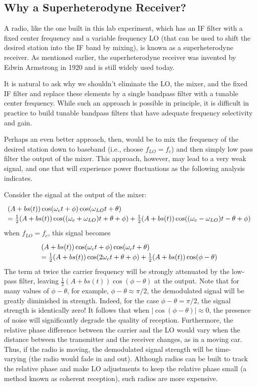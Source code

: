 \documentclass[a4paper]{article}
\begin{document}
\subsection{Why a Superheterodyne Receiver?}
A radio, like the one built in this lab experiment, which has an IF filter with a fixed center frequency and a variable frequency LO (that can be used to shift the desired station into the IF band by mixing), is known as a superheterodyne receiver. As mentioned earlier, the superheterodyne receiver was invented by Edwin Armstrong in 1920 and is still widely used today.

It is natural to ask why we shouldn’t eliminate the LO, the mixer, and the fixed IF filter and replace these elements by a single bandpass filter with a tunable center frequency. While such an approach is possible in principle, it is difficult in practice to build tunable bandpass filters that have adequate frequency selectivity and gain.

Perhaps an even better approach, then, would be to mix the frequency of the desired station down to baseband (i.e., choose $f_{LO}=f_c$) and then simply low pass filter the output of the mixer. This approach, however, may lead to a very weak signal, and one that will experience power fluctuations as the following analysis indicates.

Consider the signal at the output of the mixer:
\[\arraycolsep=1.4pt\def\arraystretch{1.2}
\begin{array}{ll}
	&(A+bs(t))\cos(\omega_ct+\phi)\cos(\omega_{LO}t+\theta)\\
	&=\frac{1}{2}(A+bs(t))\cos((\omega_c+\omega_{LO})t+\theta+\phi)+\frac{1}{2}(A+bs(t))\cos((\omega_c-\omega_{LO})t-\theta+\phi)
\end{array}\]
when $f_{LO}=f_c$, this signal becomes
\[\arraycolsep=1.4pt\def\arraystretch{1.2}
\begin{array}{ll}
	&(A+bs(t))\cos(\omega_ct+\phi)\cos(\omega_ct+\theta)\\
	&=\frac{1}{2}(A+bs(t))\cos(2\omega_ct+\theta+\phi)+\frac{1}{2}(A+bs(t))\cos(\phi-\theta)
\end{array}\]
The term at twice the carrier frequency will be strongly attenuated by the low-pass filter, leaving $\frac{1}{2}(A + bs(t))\cos(\phi-\theta)$ at the output. Note that for many values of $\phi-\theta$, for example, $\phi-\theta\approx\pi/2$, the demodulated signal will be greatly diminished in strength. Indeed, for the case $\phi-\theta=\pi/2$, the signal strength is identically zero! It follows that when $|\cos(\phi-\theta)|\approx0$, the presence of noise will significantly degrade the quality of reception. Furthermore, the relative phase difference between the carrier and the LO would vary when the distance between the transmitter and the receiver changes, as in a moving car. Thus, if the radio is moving, the demodulated signal strength will be time-varying (the radio would fade in and out). Although radios can be built to track the relative phase and make LO adjustments to keep the relative phase small (a method known as coherent reception), such radios are more expensive.
\end{document}
